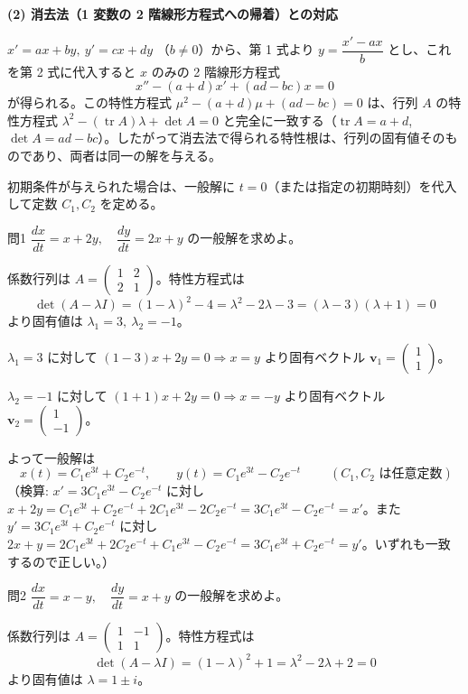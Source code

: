 \documentclass[a4paper,11pt]{article}
\begin{document}
\medskip
\noindent
\textbf{(2) 消去法（1 変数の 2 階線形方程式への帰着）との対応}

\noindent
$x' = ax + by,\ y' = cx + dy$ （$b \neq 0$）から、第 1 式より $y = \dfrac{x' - ax}{b}$ とし、これを第 2 式に代入すると $x$ のみの 2 階線形方程式
\[
x'' - (a+d)x' + (ad - bc)x = 0
\]
が得られる。この特性方程式 $\mu^{2} - (a+d)\mu + (ad-bc) = 0$ は、行列 $A$ の特性方程式 $\lambda^{2} - (\operatorname{tr} A)\lambda + \det A = 0$ と完全に一致する（$\operatorname{tr} A = a+d$, $\det A = ad - bc$）。したがって消去法で得られる特性根は、行列の固有値そのものであり、両者は同一の解を与える。

\medskip
\noindent
初期条件が与えられた場合は、一般解に $t = 0$（または指定の初期時刻）を代入して定数 $C_{1}, C_{2}$ を定める。

\clearpage
\begin{mondaiboxS}{問1}
$\dfrac{dx}{dt} = x + 2y,\quad \dfrac{dy}{dt} = 2x + y$ の一般解を求めよ。
\end{mondaiboxS}
\kaitou
係数行列は $A = \begin{pmatrix} 1 & 2 \\ 2 & 1 \end{pmatrix}$。特性方程式は
\[
\det(A - \lambda I) = (1-\lambda)^{2} - 4 = \lambda^{2} - 2\lambda - 3 = (\lambda - 3)(\lambda + 1) = 0
\]
より固有値は $\lambda_{1} = 3,\ \lambda_{2} = -1$。

\noindent
$\lambda_{1} = 3$ に対して $(1-3)x + 2y = 0 \Rightarrow x = y$ より固有ベクトル $\mathbf{v}_{1} = \begin{pmatrix} 1 \\ 1 \end{pmatrix}$。

\noindent
$\lambda_{2} = -1$ に対して $(1+1)x + 2y = 0 \Rightarrow x = -y$ より固有ベクトル $\mathbf{v}_{2} = \begin{pmatrix} 1 \\ -1 \end{pmatrix}$。

\noindent
よって一般解は
\[
\boxed{\;
x(t) = C_{1} e^{3t} + C_{2} e^{-t}, \qquad
y(t) = C_{1} e^{3t} - C_{2} e^{-t}
\;}
\qquad (C_{1}, C_{2} \text{ は任意定数})
\]
（検算: $x' = 3C_{1}e^{3t} - C_{2}e^{-t}$ に対し $x + 2y = C_{1}e^{3t}+C_{2}e^{-t}+2C_{1}e^{3t}-2C_{2}e^{-t} = 3C_{1}e^{3t}-C_{2}e^{-t} = x'$。また $y' = 3C_{1}e^{3t}+C_{2}e^{-t}$ に対し $2x+y = 2C_{1}e^{3t}+2C_{2}e^{-t}+C_{1}e^{3t}-C_{2}e^{-t} = 3C_{1}e^{3t}+C_{2}e^{-t} = y'$。いずれも一致するので正しい。）

\clearpage
\begin{mondaiboxS}{問2}
$\dfrac{dx}{dt} = x - y,\quad \dfrac{dy}{dt} = x + y$ の一般解を求めよ。
\end{mondaiboxS}
\kaitou
係数行列は $A = \begin{pmatrix} 1 & -1 \\ 1 & 1 \end{pmatrix}$。特性方程式は
\[
\det(A - \lambda I) = (1-\lambda)^{2} + 1 = \lambda^{2} - 2\lambda + 2 = 0
\]
より固有値は $\lambda = 1 \pm i$。
\end{document}
